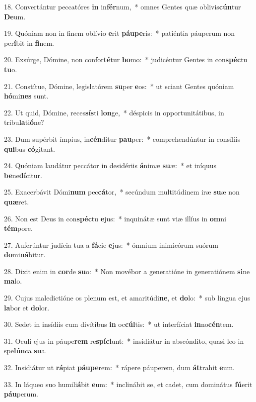 18. Convertántur peccatóres \textbf{in} in\textbf{fér}num,~*  omnes Gentes quæ oblivis\textbf{cún}tur \textbf{De}um.\

19. Quóniam non in finem oblívio \textbf{e}rit \textbf{páu}\textbf{pe}ris:~*  patiéntia páuperum non per\textbf{í}bit in \textbf{fi}nem.\

20. Exsúrge, Dómine, non confor\textbf{té}tur \textbf{ho}mo:~*  judicéntur Gentes in con\textbf{spéc}tu \textbf{tu}o.\

21. Constítue, Dómine, legislatórem \textbf{su}per \textbf{e}os:~*  ut sciant Gentes quóniam \textbf{hó}mi\textbf{nes} sunt.\

22. Ut quid, Dómine, reces\textbf{sís}ti \textbf{lon}ge,~*  déspicis in opportunitátibus, in tribu\textbf{la}ti\textbf{ó}ne?\

23. Dum supérbit ímpius, in\textbf{cén}ditur \textbf{pau}per:~*  comprehendúntur in consíliis \textbf{qui}bus \textbf{có}gitant.\

24. Quóniam laudátur peccátor in desidériis \textbf{á}nimæ \textbf{su}æ:~*  et iníquus \textbf{be}ne\textbf{dí}citur.\

25. Exacerbávit Dómi\textbf{num} pec\textbf{cá}tor,~*  secúndum multitúdinem iræ \textbf{su}æ non \textbf{quæ}ret.\

26. Non est Deus in con\textbf{spéc}tu \textbf{e}jus:~*  inquinátæ sunt viæ illíus in \textbf{om}ni \textbf{tém}pore.\

27. Auferúntur judícia tua a \textbf{fá}cie \textbf{e}jus:~*  ómnium inimicórum suórum \textbf{do}mi\textbf{ná}bitur.\

28. Dixit enim in \textbf{cor}de \textbf{su}o:~*  Non movébor a generatióne in generatiónem \textbf{si}ne \textbf{ma}lo.\

29. Cujus maledictióne os plenum est, et amaritúdi\textbf{ne}, et \textbf{do}lo:~*  sub lingua ejus \textbf{la}bor et \textbf{do}lor.\

30. Sedet in insídiis cum divítibus \textbf{in} oc\textbf{cúl}tis:~*  ut interfíciat \textbf{in}no\textbf{cén}tem.\

31. Oculi ejus in páupe\textbf{rem} re\textbf{spí}\textbf{ci}unt:~*  insidiátur in abscóndito, quasi leo in spe\textbf{lún}ca \textbf{su}a.\

32. Insidiátur ut \textbf{rá}piat \textbf{páu}\textbf{pe}rem:~*  rápere páuperem, dum \textbf{át}trahit \textbf{e}um.\

33. In láqueo suo humili\textbf{á}bit \textbf{e}um:~*  inclinábit se, et cadet, cum dominátus \textbf{fú}erit \textbf{páu}perum.\

